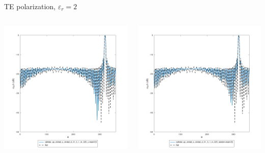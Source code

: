 \begin{frame}{TE polarization, $\varepsilon_r=2$}
\begin{columns}

\includegraphics[width=\linewidth]{results/FF/cylD_01_H_1_M_025_Z/epr2_TE_norm.png}


\includegraphics[width=\linewidth]{results/FF/cylD_01_H_1_M_025_RANDOM/epr2_TE_norm.png}

\end{columns}

\end{frame}

